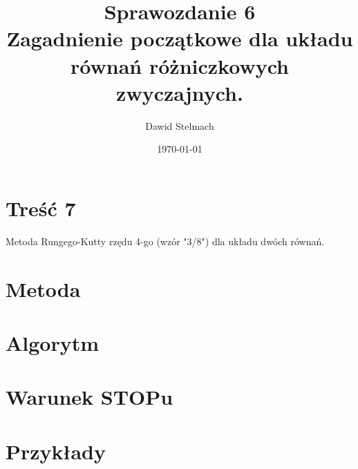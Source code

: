 \documentclass[11pt]{article}
\begin{document}
	
	\title{Sprawozdanie 6 \\ \textbf{Zagadnienie początkowe dla układu równań różniczkowych zwyczajnych.}}
	\author{Dawid Stelmach}
	\date{\today}
	\maketitle\textsl{}
	
	\section{Treść 7}
	Metoda Rungego-Kutty rzędu 4-go (wzór "3/8") dla układu dwóch równań.
	
	\section{Metoda}
	
	\section{Algorytm}

	\section{Warunek STOPu}
	
	\section{Przykłady}
	
\end{document}
